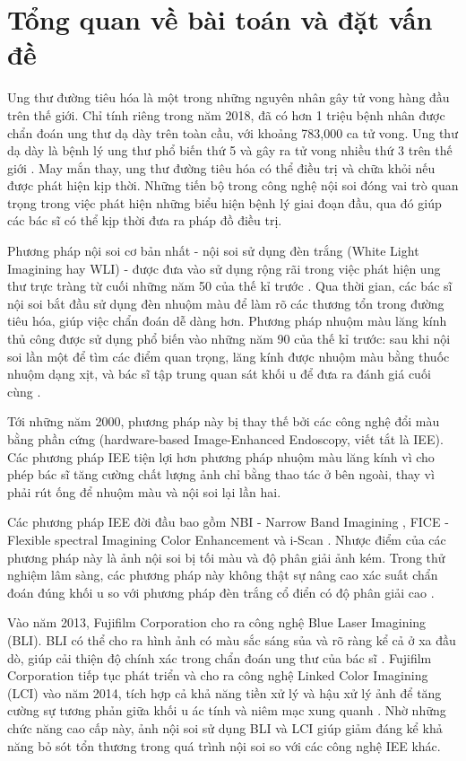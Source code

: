 \documentclass[12pt]{extreport}
\begin{document}
\chapter{Tổng quan về bài toán và đặt vấn đề}

Ung thư đường tiêu hóa là một trong những nguyên nhân gây tử vong hàng đầu trên thế giới. Chỉ tính riêng trong năm 2018, đã có hơn 1 triệu bệnh nhân được chẩn đoán ung thư dạ dày trên toàn cầu, với khoảng 783,000 ca tử vong. Ung thư dạ dày là bệnh lý ung thư phổ biến thứ 5 và gây ra tử vong nhiều thứ 3 trên thế giới \cite{https://doi.org/10.3322/caac.21492}. May mắn thay, ung thư đường tiêu hóa có thể điều trị và chữa khỏi nếu được phát hiện kịp thời. Những tiến bộ trong công nghệ nội soi đóng vai trò quan trọng trong việc phát hiện những biểu hiện bệnh lý giai đoạn đầu, qua đó giúp các bác sĩ có thể kịp thời đưa ra pháp đồ điều trị.

Phương pháp nội soi cơ bản nhất - nội soi sử dụng đèn trắng (White Light Imagining hay WLI) - được đưa vào sử dụng rộng rãi trong việc phát hiện ung thư trực tràng từ cuối những năm 50 của thế kỉ trước \cite{pmid26668791}. Qua thời gian, các bác sĩ nội soi bắt đầu sử dụng đèn nhuộm màu để làm rõ các thương tổn trong đường tiêu hóa, giúp việc chẩn đoán dễ dàng hơn. Phương pháp nhuộm màu lăng kính thủ công được sử dụng phổ biến vào những năm 90 của thế kỉ trước: sau khi nội soi lần một để tìm các điểm quan trọng, lăng kính được nhuộm màu bằng thuốc nhuộm dạng xịt, và bác sĩ tập trung quan sát khối u để đưa ra đánh giá cuối cùng \cite{pmid10613481}.

Tới những năm 2000, phương pháp này bị thay thế bởi các công nghệ đổi màu bằng phần cứng (hardware-based Image-Enhanced Endoscopy, viết tắt là IEE). Các phương pháp IEE tiện lợi hơn phương pháp nhuộm màu lăng kính vì cho phép bác sĩ tăng cường chất lượng ảnh chỉ bằng thao tác ở bên ngoài, thay vì phải rút ống để nhuộm màu và nội soi lại lần hai.

Các phương pháp IEE đời đầu bao gồm NBI - Narrow Band Imagining \cite{pmid15578301}, FICE - Flexible spectral Imagining Color Enhancement \cite{TOGASHI2009734} và i-Scan \cite{HOFFMAN201045}. Nhược điểm của các phương pháp này là ảnh nội soi bị tối màu và độ phân giải ảnh kém. Trong thử nghiệm lâm sàng, các phương pháp này không thật sự nâng cao xác suất chẩn đoán đúng khối u so với phương pháp đèn trắng cổ điển có độ phân giải cao \cite{REX200742} \cite{pmid20628363}.

Vào năm 2013, Fujifilm Corporation cho ra công nghệ Blue Laser Imagining (BLI). BLI có thể cho ra hình ảnh có màu sắc sáng sủa và rõ ràng kể cả ở xa đầu dò, giúp cải thiện độ chính xác trong chẩn đoán ung thư của bác sĩ \cite{pmid24373002}. Fujifilm Corporation tiếp tục phát triển và cho ra công nghệ Linked Color Imagining (LCI) vào năm 2014, tích hợp cả khả năng tiền xử lý và hậu xử lý ảnh để tăng cường sự tương phản giữa khối u ác tính và niêm mạc xung quanh \cite{pmid30291440}. Nhờ những chức năng cao cấp này, ảnh nội soi sử dụng BLI và LCI giúp giảm đáng kể khả năng bỏ sót tổn thương trong quá trình nội soi so với các công nghệ IEE khác.
\end{document}

